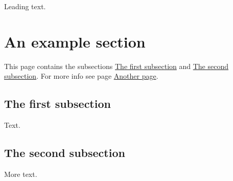Leading text. \hypertarget{page1_sec}{}\section{An example section}\label{page1_sec}
This page contains the subsections \hyperlink{page1_subsection1}{The first subsection} and \hyperlink{page1_subsection2}{The second subsection}. For more info see page \hyperlink{page2}{Another page}. \hypertarget{page1_subsection1}{}\subsection{The first subsection}\label{page1_subsection1}
Text. \hypertarget{page1_subsection2}{}\subsection{The second subsection}\label{page1_subsection2}
More text. 